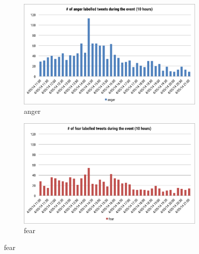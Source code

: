 \begin{figure}[htb!] 
\centering
\begin{subfigure}{0.5\textwidth}
\centering
\includegraphics[width=0.99\linewidth]{AngerInstanceEvent}
\caption{anger}
\label{fig:angerInstanceEvent}
\end{subfigure}%
\begin{subfigure}{0.5\textwidth}
\centering    
\includegraphics[width=0.99\linewidth]{FearInstanceEvent}
\caption{fear}
\label{fig:fearInstanceEvent}
\end{subfigure}


\end{figure}
